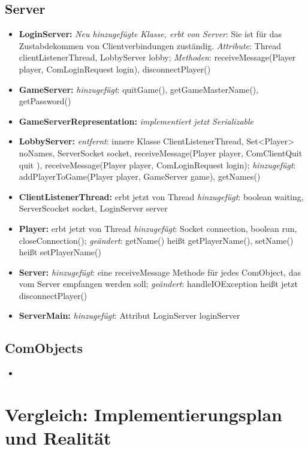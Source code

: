 \documentclass{article}
\begin{document}
\subsection{Server}

\begin{itemize}
\item  \textbf{LoginServer:}  \textit{Neu hinzugefügte Klasse, erbt von Server}: Sie ist für das Zustabdekommen von Clientverbindungen zuständig. \textit{Attribute}:  Thread clientListenerThread,  LobbyServer lobby; \textit{Methoden}: receiveMessage(Player player, ComLoginRequest login), disconnectPlayer()
\item  \textbf{GameServer:} \textit{hinzugefügt}: quitGame(), getGameMasterName(), getPassword()
\item  \textbf{GameServerRepresentation:} \textit{implementiert jetzt Serializable}
\item  \textbf{LobbyServer:} \textit{entfernt}: innere Klasse ClientListenerThread, Set<Player> noNames, ServerSocket socket, receiveMessage(Player player, ComClientQuit quit ), receiveMessage(Player player, ComLoginRequest login); \textit{hinzugefügt}: addPlayerToGame(Player player, GameServer game), getNames()
\item  \textbf{ClientListenerThread:} erbt jetzt von Thread  \textit{hinzugefügt}: boolean waiting, ServerScocket socket, LoginServer server
\item  \textbf{Player:}  erbt jetzt von Thread  \textit{hinzugefügt}: Socket connection, boolean run, closeConnection(); \textit{geändert}: getName() heißt getPlayerName(), setName() heißt setPlayerName()
\item  \textbf{Server:} \textit{hinzugefügt}: eine receiveMessage Methode für jedes ComObject, das vom Server empfangen werden soll; \textit{geändert}: handleIOException heißt jetzt disconnectPlayer()
\item  \textbf{ServerMain:} \textit{hinzugefügt}: Attribut LoginServer loginServer
\end{itemize}

\subsection{ComObjects}

\begin{itemize}
\item 
\end{itemize}

\newpage

\section{Vergleich: Implementierungsplan und Realität}
\end{document}
